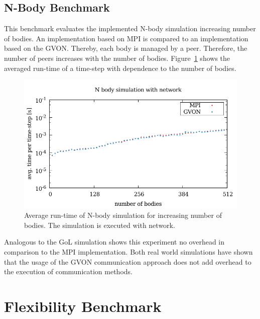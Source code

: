 \subsection{N-Body Benchmark}
This benchmark evaluates the implemented N-body simulation increasing
number of bodies. An implementation based on MPI is compared to an
implementation based on the GVON. Thereby, each body is managed by a
peer. Therefore, the number of peers increases with the number of
bodies. Figure~\ref{fig:nbody_laser} shows the averaged run-time of a
time-step with dependence to the number of bodies.

\begin{figure}[H]
  \includegraphics[width=\textwidth]{plots/50_nbody_network_laser}
  \caption{Average run-time of N-body simulation for increasing
    number of bodies. The simulation is executed with network.}
  \label{fig:nbody_laser}
\end{figure}

\noindent Analogous to the GoL simulation shows this experiment no
overhead in comparison to the MPI implementation. Both real world
simulations have shown that the usage of the GVON communication
approach does not add overhead to the execution of communication
methods.

\section{Flexibility Benchmark}

